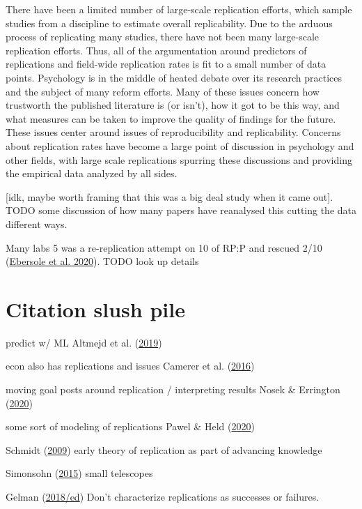 \documentclass[
  english,
  a4paper,
]{article}
\begin{document}
There have been a limited number of large-scale replication efforts, which sample studies from a discipline to estimate overall replicability. Due to the arduous process of replicating many studies, there have not been many large-scale replication efforts. Thus, all of the argumentation around predictors of replications and field-wide replication rates is fit to a small number of data points.
Psychology is in the middle of heated debate over its research practices and the subject of many reform efforts. Many of these issues concern how trustworth the published literature is (or isn't), how it got to be this way, and what measures can be taken to improve the quality of findings for the future. These issues center around issues of reproducibility and replicability. Concerns about replication rates have become a large point of discussion in psychology and other fields, with large scale replications spurring these discussions and providing the empirical data analyzed by all sides.

{[}idk, maybe worth framing that this was a big deal study when it came out{]}. TODO some discussion of how many papers have reanalysed this cutting the data different ways.

Many labs 5 was a re-replication attempt on 10 of RP:P and rescued 2/10 (\protect\hyperlink{ref-ebersole2020}{Ebersole et al. 2020}). TODO look up details

\hypertarget{citation-slush-pile}{%
\section{Citation slush pile}\label{citation-slush-pile}}

predict w/ ML Altmejd et al. (\protect\hyperlink{ref-altmejd2019}{2019})

econ also has replications and issues Camerer et al. (\protect\hyperlink{ref-camerer2016}{2016})

moving goal posts around replication / interpreting results Nosek \& Errington (\protect\hyperlink{ref-nosek2020}{2020})

some sort of modeling of replications Pawel \& Held (\protect\hyperlink{ref-pawel2020}{2020})

Schmidt (\protect\hyperlink{ref-schmidt2009}{2009}) early theory of replication as part of advancing knowledge

Simonsohn (\protect\hyperlink{ref-simonsohn2015}{2015}) small telescopes

Gelman (\protect\hyperlink{ref-gelman2018}{2018/ed}) Don't characterize replications as successes or failures.
\end{document}
